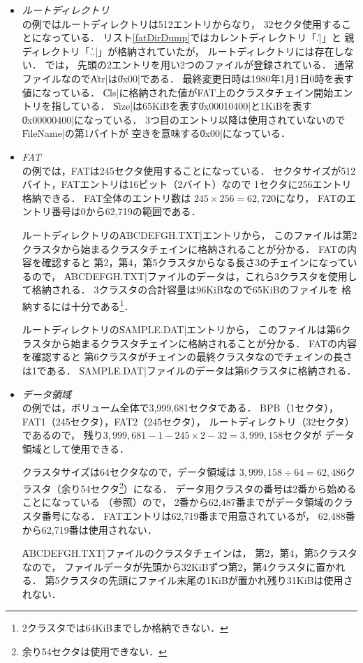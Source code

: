 \begin{itemize}
\item \emph{ルートディレクトリ}\\
  の例ではルートディレクトリは512エントリからなり，
  32セクタ使用することになっている．
  リスト\ref{fatDirDump}ではカレントディレクトリ「\|.|」と
  親ディレクトリ「\|..|」が格納されていたが，
  ルートディレクトリには存在しない．
  では，
  先頭の2エントリを用い2つのファイルが登録されている．
  通常ファイルなので\|Atr|は\|0x00|である．
  最終変更日時は1980年1月1日0時を表す値になっている．
  \|Cls|に格納された値がFAT上のクラスタチェイン開始エントリを指している．
  \|Size|は65KiBを表す\|0x00010400|と1KiBを表す\|0x00000400|になっている．
  3つ目のエントリ以降は使用されていないので\|FileName|の第1バイトが
  空きを意味する\|0x00|になっている．

\item \emph{FAT}\\
  の例では，FATは245セクタ使用することになっている．
  セクタサイズが512バイト，FATエントリは16ビット（2バイト）なので
  1セクタに256エントリ格納できる．
  FAT全体のエントリ数は
  $245 \times 256 = 62,720$になり，
  FATのエントリ番号は0から62,719の範囲である．

  ルートディレクトリの\|ABCDEFGH.TXT|エントリから，
  このファイルは第2クラスタから始まるクラスタチェインに格納されることが分かる．
  FATの内容を確認すると
  第2，第4，第5クラスタからなる長さ3のチェインになっているので，
  \|ABCDEFGH.TXT|ファイルのデータは，これら3クラスタを使用して格納される．
  3クラスタの合計容量は96KiBなので65KiBのファイルを
  格納するには十分である\footnote{2クラスタでは64KiBまでしか格納できない．}．

  ルートディレクトリの\|SAMPLE.DAT|エントリから，
  このファイルは第6クラスタから始まるクラスタチェインに格納されることが分かる．
  FATの内容を確認すると
  第6クラスタがチェインの最終クラスタなのでチェインの長さは1である．
  \|SAMPLE.DAT|ファイルのデータは第6クラスタに格納される．

\item \emph{データ領域}\\
  の例では，ボリューム全体で3,999,681セクタである．
  BPB（1セクタ），FAT1（245セクタ），FAT2（245セクタ），
  ルートディレクトリ（32セクタ）であるので，
  残り$3,999,681 - 1 - 245 \times 2 - 32 = 3,999,158$セクタが
  データ領域として使用できる．

  クラスタサイズは64セクタなので，データ領域は
  $3,999,158 \div 64 = 62,486$クラスタ（余り54セクタ\footnote{
      余り54セクタは使用できない．
  }）になる．
  データ用クラスタの番号は2番から始めることになっている
  （参照）ので，
  2番から62,487番までがデータ領域のクラスタ番号になる．
  FATエントリは62,719番まで用意されているが，
  62,488番から62,719番は使用されない．

  \|ABCDEFGH.TXT|ファイルのクラスタチェインは，
  第2，第4，第5クラスタなので，
  ファイルデータが先頭から32KiBずつ第2，第4クラスタに置かれる．
  第5クラスタの先頭にファイル末尾の1KiBが置かれ残り31KiBは使用されない．

\end{itemize}

